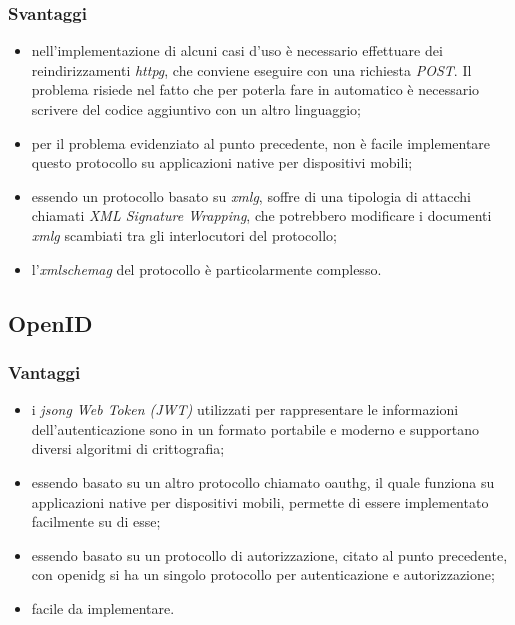     \subsubsection{Svantaggi}\label{sec:saml_svantaggi}
    \begin{itemize}
        \item nell'implementazione di alcuni casi d'uso è necessario effettuare dei reindirizzamenti \textit{\gls{httpg}}, che conviene eseguire con una richiesta \textit{POST}. Il problema risiede nel fatto che per poterla fare in automatico è necessario scrivere del codice aggiuntivo con un altro linguaggio;
        \item per il problema evidenziato al punto precedente, non è facile implementare questo protocollo su applicazioni native per dispositivi mobili;
        \item essendo un protocollo basato su \textit{\gls{xmlg}}, soffre di una tipologia di attacchi chiamati \textit{XML Signature Wrapping}, che potrebbero modificare i documenti \textit{\gls{xmlg}} scambiati tra gli interlocutori del protocollo;
        \item l'\textit{\gls{xmlschemag}} del protocollo è particolarmente complesso.
    \end{itemize}

\subsection{OpenID}
    \subsubsection{Vantaggi}
    \begin{itemize}
        \setlength\itemsep{0em}
        \item i \textit{\gls{jsong} Web Token (JWT)} utilizzati per rappresentare le informazioni dell'autenticazione sono in un formato portabile e moderno e supportano diversi algoritmi di crittografia;
        \item essendo basato su un altro protocollo chiamato \gls{oauthg}, il quale funziona su applicazioni native per dispositivi mobili, permette di essere implementato facilmente su di esse;
        \item essendo basato su un protocollo di autorizzazione, citato al punto precedente, con \gls{openidg} si ha un singolo protocollo per autenticazione e autorizzazione;
        \item facile da implementare.
    \end{itemize}
